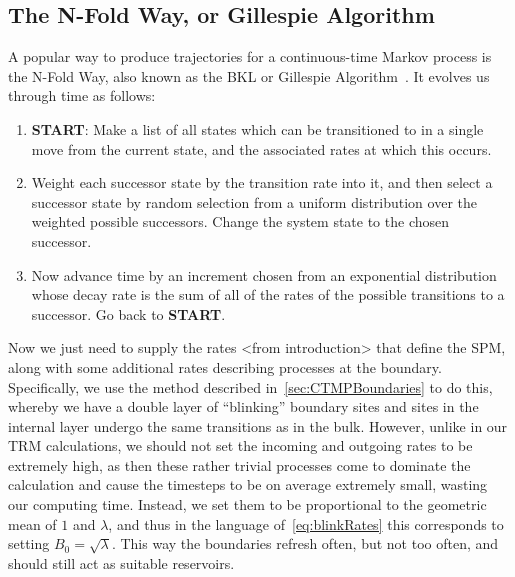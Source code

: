 \subsection{The N-Fold Way, or Gillespie Algorithm} \label{sec:nFoldWay}
A popular way to produce trajectories for a continuous-time Markov process is the N-Fold Way, also known as the
BKL or Gillespie Algorithm~\cite{Bortz1975, Prados1997, voterKMC}. It evolves us through time as follows:
\begin{enumerate}
 \item \textbf{START}: Make a list of all states which can be transitioned to in a single move from the 
 current state, and the associated rates at which this occurs.
 \item Weight each successor state by the transition rate into it, and then select a successor state by
 random selection from a uniform distribution over the weighted possible successors. Change the system
 state to the chosen successor. \label{weightingChoose}
 \item Now advance time by an increment chosen from an exponential distribution whose decay rate 
 is the sum of all of the rates of the possible transitions to a successor. Go back to \textbf{START}. \label{timestepChoose}
\end{enumerate}
Now we just need to supply the rates <from introduction> that define the SPM, along with some additional rates describing processes at the boundary. Specifically, we use the method described 
in~\ref{sec:CTMPBoundaries} to do this, whereby we have a double layer of ``blinking'' boundary sites
and sites in the internal layer undergo the same transitions as in the bulk. However, unlike in our TRM
calculations, we should not set the incoming and outgoing rates to be extremely high, as then these rather
trivial processes come to dominate the calculation and cause the timesteps to be on average extremely small, wasting our computing time. Instead, we set them to
be proportional to the geometric mean of $1$ and $\lambda$, and thus in the language of~\ref{eq:blinkRates}
this corresponds to setting $B_0 = \sqrt{\lambda}$. This way the boundaries refresh often, but not too
often, and should still act as suitable reservoirs.

